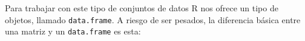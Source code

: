 \documentclass[10pt,a4paper]{article}\usepackage[]{graphicx}\usepackage[]{color}
\newcounter {cont01}
\begin{document}
Para trabajar con este tipo de conjuntos de datos R nos ofrece un tipo de objetos, llamado {\tt data.frame}. A riesgo de ser pesados, la diferencia básica entre una matriz y un {\tt data.frame} es esta:
%
%
%
\end{document}
